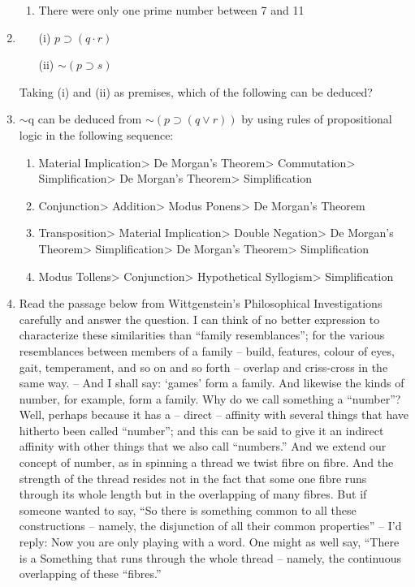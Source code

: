 \documentclass[12pt]{article}
\theoremstyle{remark}
\begin{document}
\begin{enumerate}
\begin{enumerate}
    \item There were only one prime number between 7 and 11
\end{enumerate}
\hfill{}
\item \begin{enumerate}
    \item[(i)] $p \supset (q \cdot r)$
    \item[(ii)] $\sim(p \supset s)$
\end{enumerate}
Taking (i) and (ii) as premises, which of the following can be deduced?
\begin{enumerate}
\end{enumerate}
\hfill{}
\item $\sim$q can be deduced from $\sim(p \supset (q \lor r))$ by using rules of propositional logic in the following sequence:
\begin{enumerate}
    \item Material Implication> De Morgan’s Theorem> Commutation> Simplification> De Morgan’s Theorem> Simplification 
    \item Conjunction> Addition> Modus Ponens> De Morgan’s Theorem 
    \item Transposition> Material Implication> Double Negation> De Morgan’s Theorem> Simplification> De Morgan’s Theorem> Simplification 
    \item Modus Tollens> Conjunction> Hypothetical Syllogism> Simplification
\end{enumerate}
\hfill{}
\item Read the passage below from Wittgenstein’s Philosophical Investigations carefully and answer the question.
I can think of no better expression to characterize these similarities than “family resemblances”; for the various resemblances between members of a family – build, features, colour of eyes, gait, temperament, and so on and so forth – overlap and criss-cross in the same way. – And I shall say: ‘games’ form a family. And likewise the kinds of number, for example, form a family. Why do we call something a “number”? Well, perhaps because it has a – direct – affinity with several things that have hitherto been called “number”; and this can be said to give it an indirect affinity with other things that we also call “numbers.” And we extend our concept of number, as in spinning a thread we twist fibre on fibre. And the strength of the thread resides not in the fact that some one fibre runs through its whole length but in the overlapping of many fibres. But if someone wanted to say, “So there is something common to all these constructions – namely, the disjunction of all their common properties” – I’d reply: Now you are only playing with a word. One might as well say, “There is a Something that runs through the whole thread – namely, the continuous overlapping of these “fibres.”

\end{enumerate}
\end{document}
